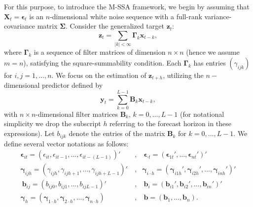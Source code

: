 \documentclass[11pt,a4paper]{article}
\begin{document}
For this purpose, to introduce the M-SSA framework, we begin by assuming that  $\mathbf{X}_t=\boldsymbol{\epsilon}_t$ is an $n$-dimensional white noise sequence with a full-rank variance-covariance matrix $\boldsymbol{\Sigma}$.
Consider the generalized target $\mathbf{z}_t$:
\[
\mathbf{z}_t=\sum_{|k|<\infty}\boldsymbol{\Gamma}_k\mathbf{x}_{t-k},
\] 
where $\boldsymbol{\Gamma}_k$  is a sequence of filter matrices of dimension  $n\times n$ (hence we assume $m=n$), satisfying the square-summability condition. Each $\boldsymbol{\Gamma}_k$ has entries $(\gamma_{ijk})$ for $i, j = 1, \ldots, n$. We focus on the estimation of $\mathbf{z}_{t+h}$, utilizing the $n-$dimensional predictor defined by
\[
\mathbf{y}_t = \sum_{k=0}^{L-1} \mathbf{B}_k \mathbf{x}_{t-k},
\]
with $n\times n$-dimensional filter matrices $\mathbf{B}_k$, $k=0,...,L-1$ (for notational simplicity we drop the subscript $h$ referring to the forecast horizon in these expressions). Let $b_{ijk}$ denote the entries of the matrix $\mathbf{B}_k$ for $k = 0, \ldots, L-1$. We define several vector notations as follows:
\begin{eqnarray*}
\boldsymbol{\epsilon}_{it}=(\epsilon_{it},\epsilon_{it-1},...,\epsilon_{it-(L-1)})'~&,&~\boldsymbol{\epsilon}_{\cdot t}=(\boldsymbol{\epsilon}_{1t}',...,\boldsymbol{\epsilon}_{nt}')'\\
\boldsymbol{\gamma}_{ijh}=(\gamma_{ijh},\gamma_{ijh+1},...,\gamma_{ijh+L-1})'~&,&\boldsymbol{\gamma}_{i\cdot h}=(\boldsymbol{\gamma}_{i1h}',\boldsymbol{\gamma}_{i2h}',...,\boldsymbol{\gamma}_{inh}')'\\
~\mathbf{b}_{ij}=(b_{ij0},b_{ij1},...,b_{ijL-1})'~&,&~\mathbf{b}_{i}=(\mathbf{b}_{i1}',\mathbf{b}_{i2}',...,\mathbf{b}_{in}')'\\
\boldsymbol{\gamma}_{h}=(\boldsymbol{\gamma}_{1\cdot h},\boldsymbol{\gamma}_{2\cdot h},...,\boldsymbol{\gamma}_{n\cdot h})
~&,&~\mathbf{b}=(\mathbf{b}_1,...,\mathbf{b}_n).%
\end{eqnarray*} 
\end{document}
